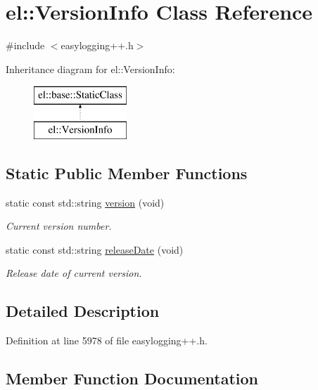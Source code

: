 \hypertarget{classel_1_1_version_info}{}\section{el\+:\+:Version\+Info Class Reference}
\label{classel_1_1_version_info}


{\ttfamily \#include $<$easylogging++.\+h$>$}

Inheritance diagram for el\+:\+:Version\+Info\+:\begin{figure}[H]
\begin{center}
\leavevmode
\includegraphics[height=2.000000cm]{classel_1_1_version_info}
\end{center}
\end{figure}
\subsection*{Static Public Member Functions}
\begin{DoxyCompactItemize}
\item 
static const std\+::string \hyperlink{classel_1_1_version_info_a6fee512d52168445b2118ff2b31b4058}{version} (void)
\begin{DoxyCompactList}\small\item\em Current version number. \end{DoxyCompactList}\item 
static const std\+::string \hyperlink{classel_1_1_version_info_ab23c2545115898f4071fa4e125204946}{release\+Date} (void)
\begin{DoxyCompactList}\small\item\em Release date of current version. \end{DoxyCompactList}\end{DoxyCompactItemize}


\subsection{Detailed Description}


Definition at line 5978 of file easylogging++.\+h.



\subsection{Member Function Documentation}
\hypertarget{classel_1_1_version_info_ab23c2545115898f4071fa4e125204946}{}
